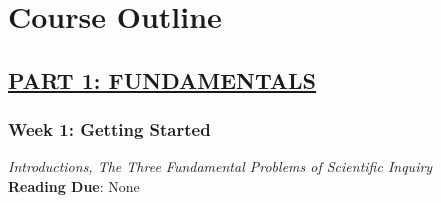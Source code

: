 \documentclass[11pt, letterpaper]{article}
\begin{document}
\begin{itemize}






\end{itemize}



\section*{Course Outline}


\subsection*{\underline{PART 1: FUNDAMENTALS}}

\subsubsection*{Week 1: Getting Started}
\textit{Introductions, The Three Fundamental Problems of Scientific Inquiry}\\
\textbf{Reading Due}: None
\end{document}

